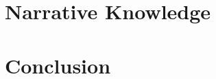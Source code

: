 \documentclass{book}
\begin{document}


\part{Narrative Knowledge}\label{sec:wuv:narr}

\part{Conclusion}\label{sec:wuv:conc}

%
%
%
%
%
%


\end{document}
